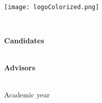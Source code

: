\begin{center}
    \begin{spacing}{2} %
       \textbf{\large {\University}}\\
    \end{spacing}
    
    \vspace{0.5cm}

    \texttt{[image: logoColorized.png]}
    
    \begin{spacing}{1.5} %
      \textbf{\large {\Course}}\\
    \end{spacing}

    \vspace{2cm} %

    \begin{spacing}{2.4} %
      \textbf{\LARGE {\thesisTitle}}
    \end{spacing}
  
    \vspace{2cm} %
  
    \begin{spacing}{1.5} %
      \textbf{\large {Candidates}}\\
      {\large \thesisAuthor}\\
    \end{spacing}

    \vspace{0.5cm} %

    \begin{spacing}{1.5} %
      \textbf {\large {Advisors}} \\
      {\large {\supervisors}}\\
    \end{spacing}

    \vfill
    \begin{center}
      {\large Academic year \thesisDate}
    \end{center}
\end{center}